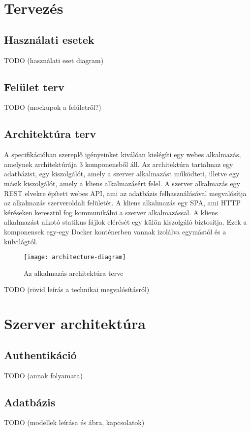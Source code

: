 \documentclass{elteikthesis}
\begin{document}
		\section{Tervezés}

			\subsection{Használati esetek}
			TODO (használati eset diagram)
			
			\subsection{Felület terv}
			TODO (mockupok a felületről?)
			
			\subsection{Architektúra terv}
				A specifikációban szereplő igényeinket kiválóan kielégíti egy webes alkalmazás, amelynek architektúrája 3 komponensből áll. Az architektúra tartalmaz egy adatbázist, egy kiszolgálót, amely a szerver alkalmazást működteti, illetve egy másik kiszolgálót, amely a kliens alkalmazásért felel. A szerver alkalmazás egy REST elvekre épített webes API, ami az adatbázis felhasználásával megvalósítja az alkalmazás szerveroldali felületét. A kliens alkalmazás egy SPA, ami HTTP kéréseken keresztül fog kommunikálni a szerver alkalmazással. A kliens alkalmazást alkotó statikus fájlok elérését egy külön kiszolgáló biztosítja. Ezek a komponensek egy-egy Docker konténerben vannak izolálva egymástól és a külvilágtól.
				
				\begin{figure}[H]
					\centering
					\texttt{[image: architecture-diagram]}
					\caption{Az alkalmazás architektúra terve}
				\end{figure}
			TODO (rövid leírás a technikai megvalósításról)
		
		\section{Szerver architektúra}

			\subsection{Authentikáció}
			TODO (annak folyamata)
			
			\subsection{Adatbázis}
			TODO (modellek leírása és ábra, kapcsolatok)
			
\end{document}
